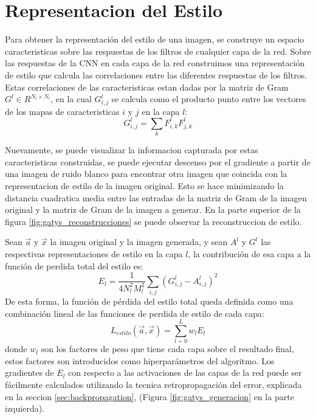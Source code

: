 \documentclass[a4paper,11pt,spanish]{book}
\begin{document}
    \section{Representacion del Estilo} \label{sec:estilo}
      Para obtener la representación del estilo de una imagen, se construye un espacio caracteristicas sobre las respuestas de los filtros de cualquier capa de la red. 
      Sobre las respuestas de la CNN en cada capa de la red construimos una representación de estilo que calcula las correlaciones entre las diferentes respuestas de los filtros.
      Estas correlaciones de las caracteristicas estan dadas por la matriz de Gram $G^l \in R^{N_l \times N_l}$, en la cual $G_{i,j}^l$ se calcula como el producto punto entre los vectores
      de los mapas de caracteristicas $i$ y $j$ en la capa $l$:
      \begin{equation}
	G_{i,j}^l = \sum_{k} F_{i,k}^l F_{j,k}^l
      \end{equation}

      Nuevamente, se puede visualizar la informacion capturada por estas caracteristicas construidas, se puede ejecutar descenso por el gradiente a partir de una imagen de ruido blanco
      para encontrar otra imagen que coincida con la representacion de estilo de la imagen original. 
      Esto se hace minimizando la distancia cuadratica media entre las entradas de la matriz de Gram de la imagen
      original y la matriz de Gram de la imagen a generar.
      En la parte superior de la figura \ref{fig:gatys_reconstrucciones} se puede observar la reconstruccion de estilo.
      
      Sean $\overrightarrow{a}$ y $\overrightarrow{x}$ la imagen original y la imagen generada, y sean $A^l$ y $G^l$
      las respectivas representaciones de estilo en la capa $l$, la contribución de esa capa a la función de perdida total del estilo es:
      \begin{equation}
       E_l = \frac{1}{4 N_l^2 M_l^2} \sum_{i,j} (G_{i,j}^l - A_{i,j}^l)^2
      \end{equation}
      De esta forma, la función de pérdida del estilo total queda definida como una combinación lineal de las funciones de perdida de estilo de cada capa:
      \begin{equation}
       L_{estilo}(\overrightarrow{a},\overrightarrow{x}) = \sum_{l=0}^{L} w_l E_l
      \end{equation}
      donde $w_l$ son los factores de peso que tiene cada capa sobre el resultado final, estos factores son introducidos como hiperparámetros del algoritmo. 
      Los gradientes de $E_l$ con respecto a las activaciones de las capas de la red puede ser fácilmente
      calculados utilizando la tecnica retropropagación del error, explicada en la seccion \ref{sec:backpropagation}, (Figura \ref{fig:gatys_generacion} en la parte izquierda).
      
\end{document}
